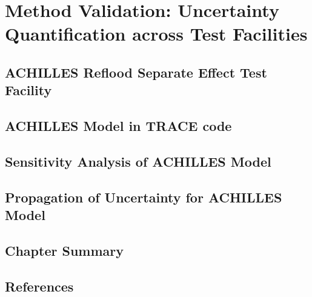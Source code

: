 \chapter{Method Validation: Uncertainty Quantification across Test Facilities}
\label{ch:validation}

\section{ACHILLES Reflood Separate Effect Test Facility}

\section{ACHILLES Model in TRACE code}

\section{Sensitivity Analysis of ACHILLES Model}

\section{Propagation of Uncertainty for ACHILLES Model}

\section{Chapter Summary}

\section{References}
